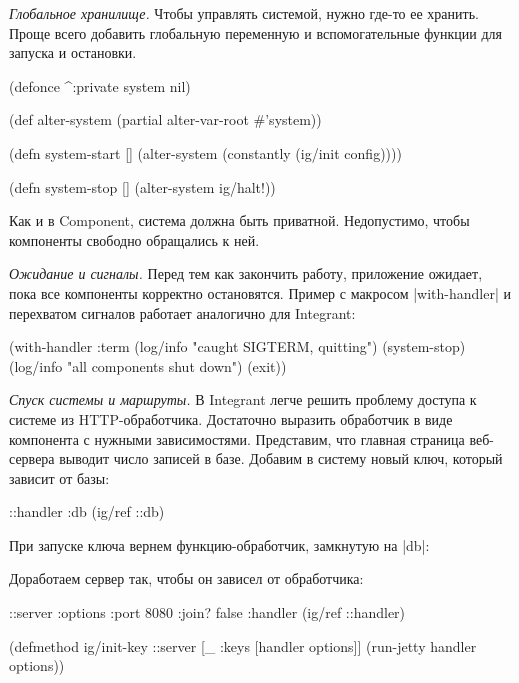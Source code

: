 \emph{Глобальное хранилище.} Чтобы управлять системой, нужно где-то ее
хранить. Проще всего добавить глобальную переменную и вспомогательные функции
для запуска и остановки.

\begin{code}
(defonce ^:private system nil)

(def alter-system (partial alter-var-root #'system))

(defn system-start []
  (alter-system (constantly (ig/init config))))

(defn system-stop []
  (alter-system ig/halt!))
\end{code}

Как и в Component, система должна быть приватной. Недопустимо, чтобы компоненты
свободно обращались к ней.

\emph{Ожидание и сигналы.} Перед тем как закончить работу, приложение ожидает, пока
все компоненты корректно остановятся. Пример с макросом \spverb|with-handler| и
перехватом сигналов работает аналогично для Integrant:

\begin{code}
(with-handler :term
  (log/info "caught SIGTERM, quitting")
  (system-stop)
  (log/info "all components shut down")
  (exit))
\end{code}

\emph{Спуск системы и маршруты.} В Integrant легче решить проблему доступа к
системе из HTTP-обработчика. Достаточно выразить обработчик в виде компонента с
нужными зависимостями. Представим, что главная страница веб-сервера выводит
число записей в базе. Добавим в систему новый ключ, который зависит от базы:

\begin{code}
{::handler {:db (ig/ref ::db)}}
\end{code}

При запуске ключа вернем функцию-обработчик, замкнутую на \spverb|db|:


Доработаем сервер так, чтобы он зависел от обработчика:

\begin{code}
{::server {:options {:port 8080 :join? false}
           :handler (ig/ref ::handler)}}

(defmethod ig/init-key ::server
  [_ {:keys [handler options]}]
  (run-jetty handler options))
\end{code}

